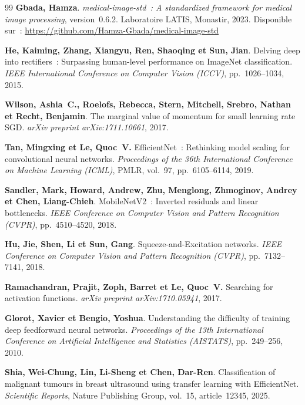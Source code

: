 \begin{thebibliography}{99}
\textbf{Gbada, Hamza}.
\textit{medical-image-std~: A standardized framework for medical
image processing}, version~0.6.2.
Laboratoire LATIS, Monastir, 2023.
Disponible sur~: \url{https://github.com/Hamza-Gbada/medical-image-std}

\textbf{He, Kaiming, Zhang, Xiangyu, Ren, Shaoqing et Sun, Jian}.
Delving deep into rectifiers~: Surpassing human-level performance
on ImageNet classification.
\textit{IEEE International Conference on Computer Vision (ICCV)},
pp.~1026--1034, 2015.

\textbf{Wilson, Ashia~C., Roelofs, Rebecca, Stern, Mitchell,
Srebro, Nathan et Recht, Benjamin}.
The marginal value of momentum for small learning rate SGD.
\textit{arXiv preprint arXiv:1711.10661}, 2017.


\textbf{Tan, Mingxing et Le, Quoc~V.}
EfficientNet~: Rethinking model scaling for convolutional neural networks.
\textit{Proceedings of the 36th International Conference on Machine Learning (ICML)},
PMLR, vol.~97, pp.~6105--6114, 2019.

\textbf{Sandler, Mark, Howard, Andrew, Zhu, Menglong, Zhmoginov, Andrey
et Chen, Liang-Chieh}.
MobileNetV2~: Inverted residuals and linear bottlenecks.
\textit{IEEE Conference on Computer Vision and Pattern Recognition (CVPR)},
pp.~4510--4520, 2018.

\textbf{Hu, Jie, Shen, Li et Sun, Gang}.
Squeeze-and-Excitation networks.
\textit{IEEE Conference on Computer Vision and Pattern Recognition (CVPR)},
pp.~7132--7141, 2018.

\textbf{Ramachandran, Prajit, Zoph, Barret et Le, Quoc~V.}
Searching for activation functions.
\textit{arXiv preprint arXiv:1710.05941}, 2017.

\textbf{Glorot, Xavier et Bengio, Yoshua}.
Understanding the difficulty of training deep feedforward neural networks.
\textit{Proceedings of the 13th International Conference on Artificial
Intelligence and Statistics (AISTATS)}, pp.~249--256, 2010.

\textbf{Shia, Wei-Chung, Lin, Li-Sheng et Chen, Dar-Ren}.
Classification of malignant tumours in breast ultrasound using transfer
learning with EfficientNet.
\textit{Scientific Reports}, Nature Publishing Group, vol.~15,
article~12345, 2025.


\end{thebibliography}
